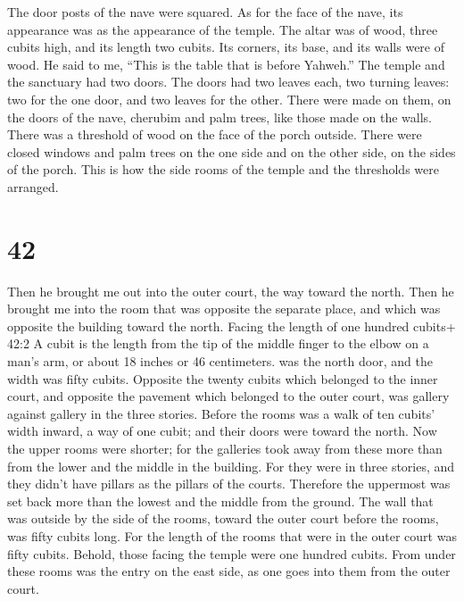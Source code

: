  The door posts of the nave were squared. As for the face
of the nave, its appearance was as the appearance of the temple.
 The altar was of wood, three cubits high, and its length
two cubits. Its corners, its base, and its walls were of wood. He said
to me, ``This is the table that is before Yahweh.''  The
temple and the sanctuary had two doors.  The doors had two
leaves each, two turning leaves: two for the one door, and two leaves
for the other.  There were made on them, on the doors of
the nave, cherubim and palm trees, like those made on the walls. There
was a threshold of wood on the face of the porch outside. 
There were closed windows and palm trees on the one side and on the
other side, on the sides of the porch. This is how the side rooms of the
temple and the thresholds were arranged.

\hypertarget{section-40}{%
\section{42}\label{section-40}}

 Then he brought me out into the outer court, the way toward
the north. Then he brought me into the room that was opposite the
separate place, and which was opposite the building toward the north.
 Facing the length of one hundred cubits+ 42:2 A cubit is
the length from the tip of the middle finger to the elbow on a man's
arm, or about 18 inches or 46 centimeters. was the north door, and the
width was fifty cubits.  Opposite the twenty cubits which
belonged to the inner court, and opposite the pavement which belonged to
the outer court, was gallery against gallery in the three stories.
 Before the rooms was a walk of ten cubits' width inward, a
way of one cubit; and their doors were toward the north. 
Now the upper rooms were shorter; for the galleries took away from these
more than from the lower and the middle in the building. 
For they were in three stories, and they didn't have pillars as the
pillars of the courts. Therefore the uppermost was set back more than
the lowest and the middle from the ground.  The wall that
was outside by the side of the rooms, toward the outer court before the
rooms, was fifty cubits long.  For the length of the rooms
that were in the outer court was fifty cubits. Behold, those facing the
temple were one hundred cubits.  From under these rooms was
the entry on the east side, as one goes into them from the outer court.

